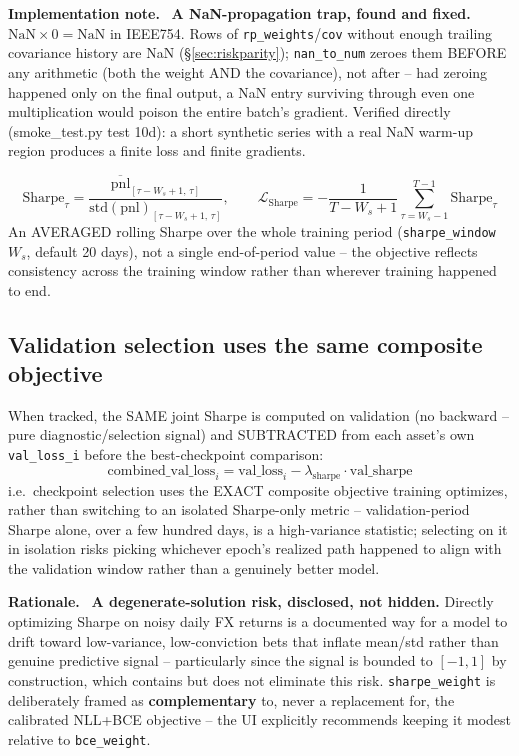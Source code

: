 \documentclass[11pt]{article}
\newcommand{\code}[1]{\texttt{\small #1}}
\newcommand{\rationalelabel}{\small\textbf{Rationale.}~}
\newcommand{\fixnotelabel}{\small\textbf{Implementation note.}~}
\begin{document}
\begin{fixnote}\fixnotelabel
\textbf{A NaN-propagation trap, found and fixed.} $\text{NaN}\times 0 = \text{NaN}$ in
IEEE754. Rows of \code{rp\_weights}/\code{cov} without enough trailing covariance history
are NaN (\S\ref{sec:riskparity}); \code{nan\_to\_num} zeroes them BEFORE any arithmetic
(both the weight AND the covariance), not after -- had zeroing happened only on the final
output, a NaN entry surviving through even one multiplication would poison the entire batch's
gradient. Verified directly (smoke\_test.py test 10d): a short synthetic series with a real
NaN warm-up region produces a finite loss and finite gradients.
\end{fixnote}

\begin{equation}
  \text{Sharpe}_\tau = \frac{\overline{\text{pnl}}_{[\tau-W_s+1,\,\tau]}}{\mathrm{std}(\text{pnl})_{[\tau-W_s+1,\,\tau]}}, \qquad
  \mathcal{L}_{\text{Sharpe}} = -\frac{1}{T-W_s+1}\sum_{\tau=W_s-1}^{T-1} \text{Sharpe}_\tau
  \label{eq:rollingsharpe}
\end{equation}
An AVERAGED rolling Sharpe over the whole training period (\code{sharpe\_window}
$W_s$, default 20 days), not a single end-of-period value -- the objective reflects
consistency across the training window rather than wherever training happened to end.

\subsection{Validation selection uses the same composite objective}

When tracked, the SAME joint Sharpe is computed on validation (no backward -- pure
diagnostic/selection signal) and SUBTRACTED from each asset's own \code{val\_loss\_i} before
the best-checkpoint comparison:
\begin{equation}
  \text{combined\_val\_loss}_i = \text{val\_loss}_i - \lambda_{\text{sharpe}} \cdot \text{val\_sharpe}
  \label{eq:combinedvalloss}
\end{equation}
i.e.\ checkpoint selection uses the EXACT composite objective training optimizes, rather
than switching to an isolated Sharpe-only metric -- validation-period Sharpe alone, over a
few hundred days, is a high-variance statistic; selecting on it in isolation risks picking
whichever epoch's realized path happened to align with the validation window rather than a
genuinely better model.

\begin{rationale}\rationalelabel
\textbf{A degenerate-solution risk, disclosed, not hidden.} Directly optimizing Sharpe on
noisy daily FX returns is a documented way for a model to drift toward low-variance,
low-conviction bets that inflate mean/std rather than genuine predictive signal --
particularly since the signal is bounded to $[-1,1]$ by construction, which contains but
does not eliminate this risk. \code{sharpe\_weight} is deliberately framed as
\textbf{complementary} to, never a replacement for, the calibrated NLL+BCE objective -- the
UI explicitly recommends keeping it modest relative to \code{bce\_weight}.
\end{rationale}
\end{document}

